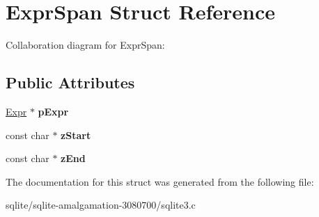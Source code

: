 \hypertarget{struct_expr_span}{\section{Expr\+Span Struct Reference}
\label{struct_expr_span}
}


Collaboration diagram for Expr\+Span\+:
\subsection*{Public Attributes}
\begin{DoxyCompactItemize}
\item 
\hypertarget{struct_expr_span_a081c4aa031331c8518c1173b2a8335cc}{\hyperlink{struct_expr}{Expr} $\ast$ {\bfseries p\+Expr}}\label{struct_expr_span_a081c4aa031331c8518c1173b2a8335cc}

\item 
\hypertarget{struct_expr_span_af4653638d7e67a62e7a607f682b38e25}{const char $\ast$ {\bfseries z\+Start}}\label{struct_expr_span_af4653638d7e67a62e7a607f682b38e25}

\item 
\hypertarget{struct_expr_span_a7cdf42cea729fcb5a1c477c3825ab575}{const char $\ast$ {\bfseries z\+End}}\label{struct_expr_span_a7cdf42cea729fcb5a1c477c3825ab575}

\end{DoxyCompactItemize}


The documentation for this struct was generated from the following file\+:\begin{DoxyCompactItemize}
\item 
sqlite/sqlite-\/amalgamation-\/3080700/sqlite3.\+c\end{DoxyCompactItemize}
